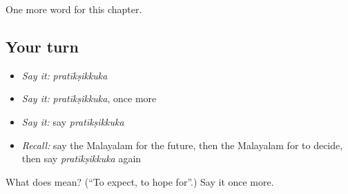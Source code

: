 \begin{grammarlens}[title={What you've built}]
One more word for this chapter.
\end{grammarlens}

\subsection*{Your turn}
\begin{itemize}
\raggedright
  \item \emph{Say it:} \emph{pratīkṣikkuka}
  \item \emph{Say it:} \emph{pratīkṣikkuka}, once more
  \item \emph{Say it:} say \emph{pratīkṣikkuka}
  \item \emph{Recall:} say the Malayalam for the future, then the Malayalam for to decide, then say \emph{pratīkṣikkuka} again
\end{itemize}

\begin{tcolorbox}[breakable,colback=teal!4,colframe=teal!35!black,title={Before you move on}]
What does  mean? (\textquotedblleft{}To expect, to hope for\textquotedblright{}.) Say it once more.
\end{tcolorbox}
